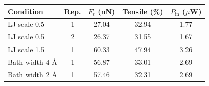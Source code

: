 \begin{tabular*}{\linewidth}{@{\extracolsep{\fill}}lcccc@{}}\toprule
Condition & Rep. & $\overline{F}_t$ (nN) & Tensile (\%) & $\overline{P}_{\mathrm{in}}$ ($\mu$W)\\\midrule
LJ scale 0.5 & 1 & 27.04 & 32.94 & 1.77 \\
LJ scale 0.5 & 2 & 26.37 & 31.55 & 1.67 \\
LJ scale 1.5 & 1 & 60.33 & 47.94 & 3.26 \\
Bath width 4 \AA & 1 & 56.87 & 33.01 & 2.69 \\
Bath width 2 \AA & 1 & 57.46 & 32.31 & 2.69 \\
\bottomrule
\end{tabular*}
